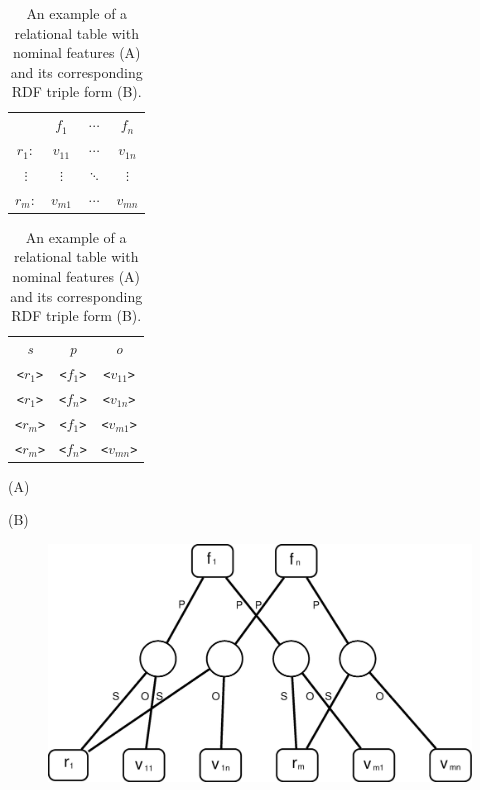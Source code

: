 \begin{table}[ht]
\begin{minipage}[c]{0.4\linewidth}\begin{flushright}
\begin{tabular}{ c | c | c | c |}
\cline{2-4}
	~   & $f_1$	    & $\cdots$  & $f_n$   \\
\cline{2-4}
$r_1:$	& $v_{11}$	& $\cdots$  & $v_{1n}$\\
\cline{2-4}
$\vdots$& $\vdots$  & $\ddots$  & $\vdots$\\
\cline{2-4}
$r_m:$	& $v_{m1}$	& $\cdots$  & $v_{mn}$\\
\cline{2-4}
\end{tabular}
\end{flushright}
\end{minipage}
\hfill
\begin{minipage}[c]{0.4\linewidth}
\begin{tabular}{c c c}
\emph{s}&   \emph{p}&  \emph{o}\\
\texttt{<$r_1$>}   &  \texttt{<$f_1$>}  &  \texttt{<$v_{11}$>}\\
\texttt{<$r_1$>}   &  \texttt{<$f_n$>}  &  \texttt{<$v_{1n}$>}\\
\texttt{<$r_m$>}   &  \texttt{<$f_1$>}  &  \texttt{<$v_{m1}$>}\\
\texttt{<$r_m$>}   &  \texttt{<$f_n$>}  &  \texttt{<$v_{mn}$>}\\
\end{tabular}
\end{minipage}
\begin{minipage}[c]{0.4\linewidth}\centering
\vspace{0.2cm}\hspace{2.8cm}(A)
\end{minipage}
\begin{minipage}[c]{0.4\linewidth}\centering
\vspace{0.2cm}\hspace{3.5cm}(B)
\end{minipage}
\caption{\label{tbl:nominal-rel} An example of a relational table with nominal features (A) and its corresponding RDF triple form (B).}
\end{table}

\begin{figure}[tbh]
\begin{center}
\includegraphics[width=.5\textwidth]{fig/BG-relational-nominal.eps}
\end{center}
\caption{\label{fig:BG-relational-nominal} }
\end{figure}


